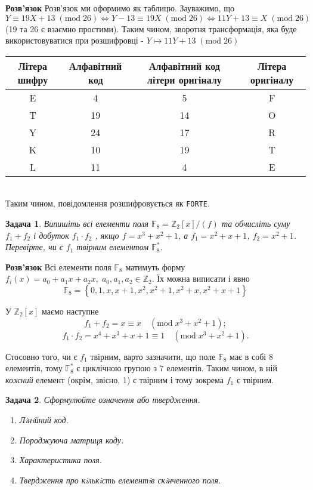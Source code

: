 \documentclass[12pt]{article} %
\newtheorem{problem}{Задача}
\newenvironment{solution}%
{\par\textbf{Розв'язок}\space }%
{\par}
\newcommand{\mymod}{\mathrm{mod}\;}
\begin{document}
\begin{solution}
	Розв’язок ми оформимо як таблицю. Зауважимо, що $Y\equiv 19X+13\;(\mymod 26)\Leftrightarrow Y-13\equiv 19X\;(\mymod 26)
	\Leftrightarrow 11Y+13\equiv X\;(\mymod 26)$ (19 та 26 є взаємно простими). Таким чином, зворотня трансформація, яка буде
	використовуватися при розшифровці - $Y\mapsto 11Y+13\;(\mymod 26)$\\
	\begin{tabular}{|c|c|c|c|}
		\hline
		Літера шифру & Алфавітний код & Алфавітний код літери оригіналу & Літера оригіналу\\
		\hline
		E & 4 & 5 & F\\
		\hline
		T & 19 & 14 & O\\
		\hline
		Y & 24 & 17 & R\\
		\hline
		K & 10 & 19 & T\\
		\hline
		L & 11 & 4 & E\\
		\hline
	\end{tabular}\\
	Таким чином, повідомлення розшифровується як \texttt{FORTE}.
\end{solution}
\begin{problem}
	Випишіть всі елементи поля $\mathbb{F}_8 = \mathbb{Z}_2 [x]/(f)$ та обчисліть суму $f_1 + f_2$ і
добуток $f_1 \cdot f_2$ , якщо $f = x^3 + x^2 + 1$, а $f_1 = x^2 + x + 1$, $f_2 = x^2 + 1$. Перевірте, чи є
$f_1$ твірним елементом $\mathbb{F}^*_8 $.
\end{problem}
\begin{solution}
	Всі елементи поля $\mathbb{F}_8 $ матимуть форму $f_i(x)=a_0+a_1x+a_2x,\;a_0,a_1,a_2\in\mathbb{Z}_2$. Їх можна виписати і явно
	\[\mathbb{F}_8=\left\{0,1,x,x+1,x^2,x^2+1,x^2+x,x^2+x+1\right\}\]

	У $\mathbb{Z}_2[x]$ маємо наступне
	\[f_1+ f_2=x\equiv x\quad(\mymod x^3+x^2+1);\]
	\[f_1\cdot f_2=x^4+x^3+x+1\equiv 1\quad(\mymod x^3+x^2+1).\]

	Стосовно того, чи є $f_1$ твірним, варто зазначити, що поле $\mathbb{F}_8$ має в собі 8 елементів, тому $\mathbb{F}^*_8$ є циклічною групою з 7 елементів. Таким чином, в ній \textit{кожний} елемент (окрім, звісно, 1) є
	твірним і тому зокрема $f_1$ є твірним.
\end{solution}
\begin{problem}
 Сформулюйте означення або твердження.
 \begin{enumerate}[label=\arabic*)]
	 \item{Лiнiйний код.}
	 \item{Породжуюча матриця коду.}
	 \item{Характеристика поля.}
	 \item{Твердження про кiлькiсть елементiв скiнченного поля.}
 \end{enumerate}
\end{problem}
\end{document}
